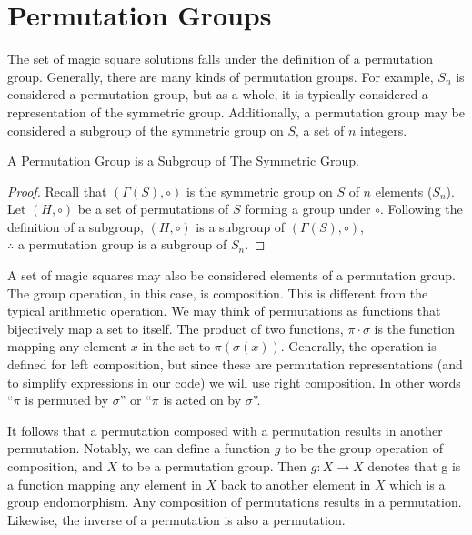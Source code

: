 \documentclass{rhumj_new}
\begin{document}
\section{Permutation Groups}

The set of magic square solutions falls under the definition of a permutation group.
Generally, there are many kinds of permutation groups. For example, $S_n$ is considered a
permutation group, but as a whole, it is typically considered a representation of the symmetric
group. Additionally, a permutation group may be considered a subgroup of the symmetric group on
$S$,
a set of $n$ integers.

\begin{thm} A Permutation Group is a Subgroup of The Symmetric Group.
\end{thm}\label{thmperm}

\begin{proof}
  Recall that $\left(\varGamma\left(S\right), \circ \right)$ is the symmetric group on $S$ of $n$
  elements ($S_n$). Let $\left(H,\circ\right)$ be a set of permutations of $S$ forming a group
  under
  $\circ$. Following the definition of a subgroup, $\left(H,\circ\right)$ is a subgroup of
  $\left(\varGamma\left(S\right), \circ \right)$,\\ $\therefore$ a permutation group is a
  subgroup of
  $S_n$.
\end{proof}

A set of magic squares may also be considered elements of a permutation group. The group
operation, in this case, is composition. This is different from the typical arithmetic operation.
We may think of permutations as functions that bijectively map a set to itself. The product of two
functions, $\pi\cdot\sigma$ is the function mapping any element $x$ in the set to
$\pi\left(\sigma\left(x\right)\right)$. Generally, the operation is defined for left composition,
but since these are permutation representations (and to simplify expressions in our code) we will
use right composition. In other words ``$\pi$ is permuted by $\sigma$'' or ``$\pi$ is acted on by
$\sigma$''.

It follows that a permutation composed with a permutation results in another permutation.
Notably, we can define a function $g$ to be the group operation of composition, and $X$ to be a
permutation group. Then $g:X\rightarrow X$ denotes that g is a function mapping any element in $X$
back to another element in $X$ which is a group endomorphism. Any composition of permutations
results in a permutation. Likewise, the inverse of a permutation is also a permutation.
\end{document}
